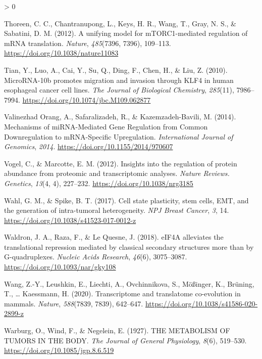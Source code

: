 \documentclass[
  12pt,
  openany]{book}
\newlength{\cslhangindent}
\newenvironment{CSLReferences}[2] %
 {%
  \setlength{\parindent}{0pt}
  \ifodd #1 \everypar{\setlength{\hangindent}{\cslhangindent}}\ignorespaces\fi
  \ifnum #2 > 0
  \setlength{\parskip}{#2\baselineskip}
  \fi
 }%
 {}
\begin{document}
\begin{CSLReferences}{1}{0}
\leavevmode\hypertarget{ref-Thoreen2012}{}%
Thoreen, C. C., Chantranupong, L., Keys, H. R., Wang, T., Gray, N. S., \& Sabatini, D. M. (2012). A unifying model for {mTORC1}-mediated regulation of {mRNA} translation. \emph{Nature}, \emph{485}(7396, 7396), 109--113. \url{https://doi.org/10.1038/nature11083}

\leavevmode\hypertarget{ref-Tian2010}{}%
Tian, Y., Luo, A., Cai, Y., Su, Q., Ding, F., Chen, H., \& Liu, Z. (2010). {MicroRNA}-10b promotes migration and invasion through {KLF4} in human esophageal cancer cell lines. \emph{The Journal of Biological Chemistry}, \emph{285}(11), 7986--7994. \url{https://doi.org/10.1074/jbc.M109.062877}

\leavevmode\hypertarget{ref-ValinezhadOrang2014}{}%
Valinezhad Orang, A., Safaralizadeh, R., \& Kazemzadeh-Bavili, M. (2014). Mechanisms of {miRNA}-{Mediated Gene Regulation} from {Common Downregulation} to {mRNA}-{Specific Upregulation}. \emph{International Journal of Genomics}, \emph{2014}. \url{https://doi.org/10.1155/2014/970607}

\leavevmode\hypertarget{ref-Vogel2012}{}%
Vogel, C., \& Marcotte, E. M. (2012). Insights into the regulation of protein abundance from proteomic and transcriptomic analyses. \emph{Nature Reviews. Genetics}, \emph{13}(4, 4), 227--232. \url{https://doi.org/10.1038/nrg3185}

\leavevmode\hypertarget{ref-Wahl2017}{}%
Wahl, G. M., \& Spike, B. T. (2017). Cell state plasticity, stem cells, {EMT}, and the generation of intra-tumoral heterogeneity. \emph{NPJ Breast Cancer}, \emph{3}, 14. \url{https://doi.org/10.1038/s41523-017-0012-z}

\leavevmode\hypertarget{ref-Waldron2018}{}%
Waldron, J. A., Raza, F., \& Le Quesne, J. (2018). {eIF4A} alleviates the translational repression mediated by classical secondary structures more than by {G}-quadruplexes. \emph{Nucleic Acids Research}, \emph{46}(6), 3075--3087. \url{https://doi.org/10.1093/nar/gky108}

\leavevmode\hypertarget{ref-Wang2020}{}%
Wang, Z.-Y., Leushkin, E., Liechti, A., Ovchinnikova, S., Mößinger, K., Brüning, T., \ldots{} Kaessmann, H. (2020). Transcriptome and translatome co-evolution in mammals. \emph{Nature}, \emph{588}(7839, 7839), 642--647. \url{https://doi.org/10.1038/s41586-020-2899-z}

\leavevmode\hypertarget{ref-Warburg1927}{}%
Warburg, O., Wind, F., \& Negelein, E. (1927). {THE METABOLISM OF TUMORS IN THE BODY}. \emph{The Journal of General Physiology}, \emph{8}(6), 519--530. \url{https://doi.org/10.1085/jgp.8.6.519}


\end{CSLReferences}
\end{document}
